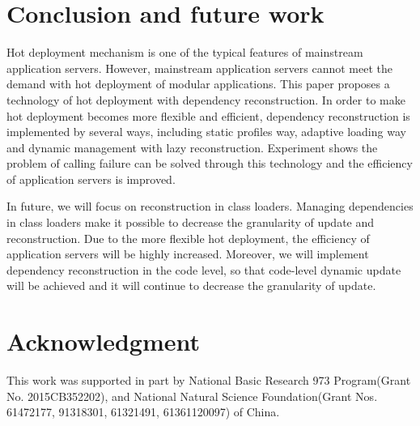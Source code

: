 \documentclass[conference]{IEEEtran}
\begin{document}
\section{Conclusion and future work\label{sec:conclusion}}
Hot deployment mechanism is one of the typical features of mainstream application servers.
However, mainstream application servers cannot meet the demand with hot deployment of modular applications.
This paper proposes a technology of hot deployment with dependency reconstruction.
In order to make hot deployment becomes more flexible and efficient, dependency reconstruction is implemented by several ways, including static profiles way, adaptive loading way and dynamic management with lazy reconstruction.
Experiment shows the problem of calling failure can be solved through this technology and the efficiency of application servers is improved.

In future, we will focus on reconstruction in class loaders.
Managing dependencies in class loaders make it possible to decrease the granularity of update and reconstruction.
Due to the more flexible hot deployment, the efficiency of application servers will be highly increased.
Moreover, we will implement dependency reconstruction in the code level\cite{future_Gu}, so that code-level dynamic update will be achieved and it will continue to decrease the granularity of update.


\section*{Acknowledgment}
This work was supported in part by National Basic Research 973 Program(Grant No. 2015CB352202), and National Natural Science Foundation(Grant Nos. 61472177, 91318301, 61321491, 61361120097) of China.

\end{document}
